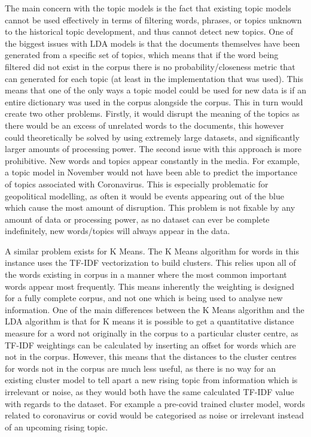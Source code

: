 The main concern with the topic models is the fact that existing topic models cannot be used effectively in terms of filtering words, phrases, or topics unknown to the historical topic development, and thus cannot detect new topics. One of the biggest issues with LDA models is that the documents themselves have been generated from a specific set of topics, which means that if the word being filtered did not exist in the corpus there is no probability/closeness metric that can generated for each topic (at least in the implementation that was used). This means that one of the only ways a topic model could be used for new data is if an entire dictionary was used in the corpus alongside the corpus. This in turn would create two other problems. Firstly, it would disrupt the meaning of the topics as there would be an excess of unrelated words to the documents, this however could theoretically be solved by using extremely large datasets, and significantly larger amounts of processing power. The second issue with this approach is more prohibitive. New words and topics appear constantly in the media. For example, a topic model in November would not have been able to predict the importance of topics associated with Coronavirus. This is especially problematic for geopolitical modelling, as often it would be events appearing out of the blue which cause the most amount of disruption. This problem is not fixable by any amount of data or processing power, as no dataset can ever be complete indefinitely, new words/topics will always appear in the data.  

A similar problem exists for K Means. The K Means algorithm for words in this instance uses the TF-IDF vectorization to build clusters. This relies upon all of the words existing in corpus in a manner where the most common important words appear most frequently. This means inherently the weighting is designed for a fully complete corpus, and not one which is being used to analyse new information. One of the main differences between the K Means algorithm and the LDA algorithm is that for K means it is possible to get a quantitative distance measure for a word not originally in the corpus to a particular cluster centre, as TF-IDF weightings can be calculated by inserting an offset for words which are not in the corpus. However, this means that the distances to the cluster centres for words not in the corpus are much less useful, as there is no way for an existing cluster model to tell apart a new rising topic from information which is irrelevant or noise, as they would both have the same calculated TF-IDF value with regards to the dataset. For example a pre-covid trained cluster model, words related to coronavirus or covid would be categorised as noise or irrelevant instead of an upcoming rising topic.

